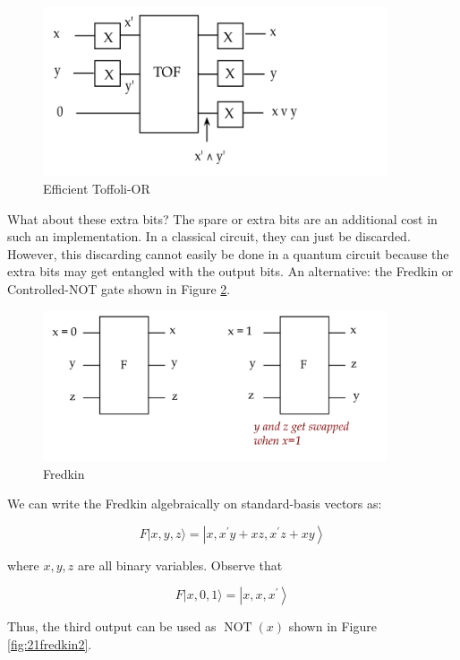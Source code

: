 \documentclass[main.tex]{subfiles}
\begin{document}
    \begin{figure}
        \centering
        \includegraphics[width=4in]{notes/figs/n10/19toffoli5.png}
        \caption{Efficient Toffoli-OR}
        \label{fig:19toffoli5}
    \end{figure}
    
    What about these extra bits? The spare or extra bits are an additional cost in such an implementation. In a classical circuit, they can just be discarded. However, this discarding cannot easily be done in a quantum circuit because the extra bits may get entangled with the output bits. An alternative: the Fredkin or Controlled-NOT gate shown in Figure \ref{fig:20fredkin}.
    
    \begin{figure}
        \centering
        \includegraphics[width=4in]{notes/figs/n10/20fredkin.png}
        \caption{Fredkin}
        \label{fig:20fredkin}
    \end{figure}
    
    We can write the Fredkin algebraically on standard-basis vectors as:
    
    $$
    F|x, y, z\rangle=\left|x, x^{\prime} y+x z, x^{\prime} z+x y\right\rangle
    $$
    
    where $x, y, z$ are all binary variables. Observe that
    
    $$
    F|x, 0,1\rangle=\left|x, x, x^{\prime}\right\rangle
    $$
    
    Thus, the third output can be used as $\operatorname{NOT}(x)$ shown in Figure \ref{fig:21fredkin2}.
    
\end{document}

